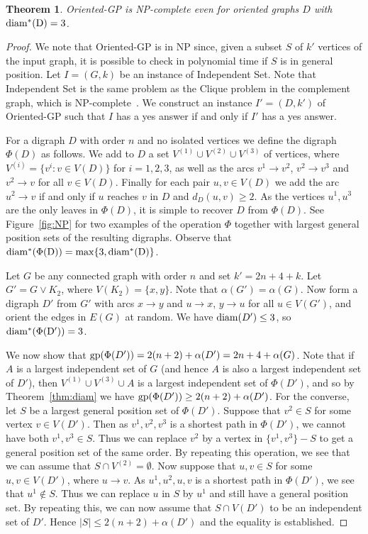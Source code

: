 \documentclass[a4paper,12pt]{article}
\newtheorem{theorem}{Theorem}[section]
\theoremstyle{definition}
\newcommand{\IS}{{\sc Independent Set}\xspace}
\newcommand{\GP}{{\sc Oriented-GP}\xspace}
\newcommand{\gp}{{\rm gp}}
\newcommand{\diam}{{\rm diam}}
\newcommand{\diamm}{\rm diam ^*}
\begin{document}
	
	\begin{theorem}\label{thm:NP}
		\GP is NP-complete even for oriented graphs $D$ with \newline $\diamm(D)=3$.
	\end{theorem}
	\begin{proof}
		We note that \GP is in NP since, given a subset $S$ of $k'$ vertices of the input graph, it is possible to check in polynomial time if $S$ is in general position. Let $I = (G,k)$ be an instance of \IS. Note that \IS is the same problem as the {\sc Clique} problem in the complement graph, which is NP-complete~\cite{Karp72}. We construct an instance $I' = (D,k')$ of \GP such that $I$ has a yes answer if and only if $I'$ has a yes answer.
		
		For a digraph $D$ with order $n$ and no isolated vertices we define the digraph $\Phi (D)$ as follows. We add to $D$ a set $V^{(1)} \cup V^{(2)} \cup V^{(3)}$ of vertices, where $V^{(i)} = \{ v^i : v \in V(D)\} $ for $i = 1,2,3$, as well as the arcs $v^1 \rightarrow v^2$, $v^2 \rightarrow v^3$ and $v^2 \rightarrow v$ for all $v \in V(D)$. Finally for each pair $u,v \in V(D)$ we add the arc $u^2 \rightarrow v$ if and only if $u$ reaches $v$ in $D$ and $d_D(u,v) \geq 2$. As the vertices $u^1,u^3$ are the only leaves in $\Phi (D)$, it is simple to recover $D$ from $\Phi (D)$. See Figure~\ref{fig:NP} for two examples of the operation $\Phi $ together with largest general position sets of the resulting digraphs. Observe that $\diamm (\Phi (D)) = \max \{ 3,\diamm (D)\} $.
		
		Let $G$ be any connected graph with order $n$ and set $k' = 2n+4+k$. Let $G' = G \vee K_2$, where $V(K_2) = \{ x,y\} $. Note that $\alpha (G') = \alpha (G)$. Now form a digraph $D'$ from $G'$ with arcs $x \rightarrow y$ and  $u \rightarrow x$, $y \rightarrow u$ for all $u \in V(G')$, and orient the edges in $E(G)$ at random. We have $\diam (D') \leq 3$, so $\diamm (\Phi (D')) = 3$. 
		
		We now show that $\gp (\Phi (D')) = 2(n+2)+\alpha (D') = 2n+4+\alpha (G)$. Note that if $A$ is a largest independent set of $G$ (and hence $A$ is also a largest independent set of $D'$), then $V^{(1)} \cup V^{(3)} \cup A$ is a largest independent set of $\Phi (D')$, and so by Theorem~\ref{thm:diam} we have $\gp (\Phi (D')) \geq 2(n+2)+\alpha (D')$. For the converse, let $S$ be a largest general position set of $\Phi (D')$. Suppose that $v^2 \in S$ for some vertex $v \in V(D')$. Then as $v^1,v^2,v^3$ is a shortest path in $\Phi (D')$, we cannot have both $v^1,v^3 \in S$. Thus we can replace $v^2$ by a vertex in $\{ v^1,v^3\} - S$ to get a general position set of the same order. By repeating this operation, we see that we can assume that $S \cap V^{(2)} = \emptyset $. Now suppose that $u,v \in S$ for some $u,v \in V(D')$, where $u \rightarrow v$. As $u^1,u^2,u,v$ is a shortest path in $\Phi (D')$, we see that $u^1 \not \in S$. Thus we can replace $u$ in $S$ by $u^1$ and still have a general position set. By repeating this, we can now assume that $S \cap V(D')$ to be an independent set of $D'$. Hence $|S| \leq 2(n+2)+\alpha (D')$ and the equality is established.
		

\end{proof}
\end{document}
